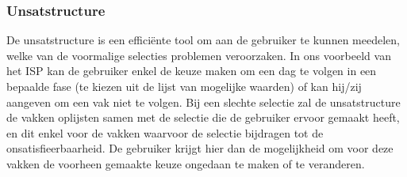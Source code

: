 \subsubsection{Unsatstructure}
De unsatstructure is een effici\"{e}nte tool om aan de gebruiker te kunnen meedelen, welke van de voormalige selecties problemen veroorzaken. In ons voorbeeld van het ISP kan de gebruiker enkel de keuze maken om een dag te volgen in een bepaalde fase (te kiezen uit de lijst van mogelijke waarden) of kan hij/zij aangeven om een vak niet te volgen. 
Bij een slechte selectie zal de unsatstructure de vakken oplijsten samen met de selectie die de gebruiker ervoor gemaakt heeft, en dit enkel voor de vakken waarvoor de selectie bijdragen tot de onsatisfieerbaarheid. De gebruiker krijgt hier dan de mogelijkheid om voor deze vakken de voorheen gemaakte keuze ongedaan te maken of te veranderen. 

